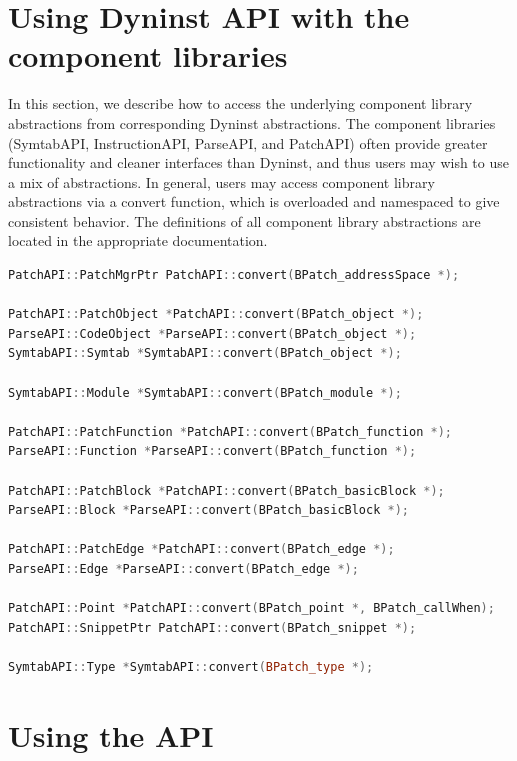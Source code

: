 \documentclass[twopages,a4paper]{article}
\begin{document}
\pagebreak
\tableofcontents

\pagebreak










\section{Using Dyninst API with the component libraries}\label{sec:using_api}

In this section, we describe how to access the underlying component library abstractions from corresponding Dyninst abstractions. The component libraries (SymtabAPI, InstructionAPI, ParseAPI, and PatchAPI) often provide greater functionality and cleaner interfaces than Dyninst, and thus users may wish to use a mix of abstractions. In general, users may access component library abstractions via a convert function, which is overloaded and namespaced to give consistent behavior. The definitions of all component library abstractions are located in the appropriate documentation. 


\begin{lstlisting}[language=c++]
PatchAPI::PatchMgrPtr PatchAPI::convert(BPatch_addressSpace *);

PatchAPI::PatchObject *PatchAPI::convert(BPatch_object *);
ParseAPI::CodeObject *ParseAPI::convert(BPatch_object *);
SymtabAPI::Symtab *SymtabAPI::convert(BPatch_object *);

SymtabAPI::Module *SymtabAPI::convert(BPatch_module *);

PatchAPI::PatchFunction *PatchAPI::convert(BPatch_function *);
ParseAPI::Function *ParseAPI::convert(BPatch_function *);

PatchAPI::PatchBlock *PatchAPI::convert(BPatch_basicBlock *);
ParseAPI::Block *ParseAPI::convert(BPatch_basicBlock *);

PatchAPI::PatchEdge *PatchAPI::convert(BPatch_edge *);
ParseAPI::Edge *ParseAPI::convert(BPatch_edge *);

PatchAPI::Point *PatchAPI::convert(BPatch_point *, BPatch_callWhen);
PatchAPI::SnippetPtr PatchAPI::convert(BPatch_snippet *);

SymtabAPI::Type *SymtabAPI::convert(BPatch_type *);
\end{lstlisting}

\pagebreak

\section{Using the API}
\end{document}
